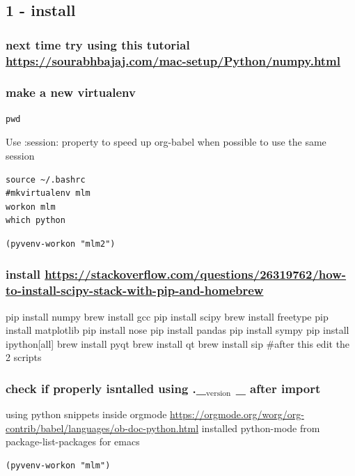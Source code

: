 \documentclass[11pt]{article}
\begin{document}
\subsection{1 - install}
\label{sec:org51abaaa}
\subsubsection{next time try using this tutorial \url{https://sourabhbajaj.com/mac-setup/Python/numpy.html}}
\label{sec:org64f8908}
\subsubsection{make a new virtualenv}
\label{sec:orgf4872ae}
\begin{verbatim}
pwd
\end{verbatim}


Use :session: property to speed up org-babel when possible to use the same session
\begin{verbatim}
source ~/.bashrc
#mkvirtualenv mlm
workon mlm
which python
\end{verbatim}

\begin{verbatim}
(pyvenv-workon "mlm2")
\end{verbatim}

\subsubsection{install \url{https://stackoverflow.com/questions/26319762/how-to-install-scipy-stack-with-pip-and-homebrew}}
\label{sec:org7caeea9}
pip install numpy
brew install gcc
pip install scipy
brew install freetype
pip install matplotlib
pip install nose
pip install pandas
pip install sympy
pip install ipython[all]
brew install pyqt
brew install qt
brew install sip
\#after this edit the 2 scripts
\subsubsection{check if properly isntalled using .\_\(_{\text{version}}\) \_ after import}
\label{sec:org86e42a5}

using python snippets inside orgmode \url{https://orgmode.org/worg/org-contrib/babel/languages/ob-doc-python.html}
installed python-mode from package-list-packages for emacs
\begin{verbatim}
(pyvenv-workon "mlm")
\end{verbatim}
\end{document}
